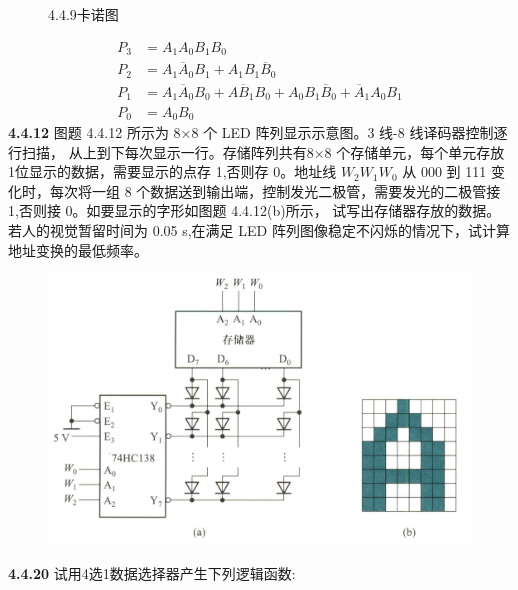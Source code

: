 \documentclass[a4paper,11pt,UTF8]{article}
\begin{document}
\begin{figure}[H]
	\centering
	\setcounter{subfigure}{0}
	\caption{4.4.9卡诺图}
\end{figure}
$$\begin{aligned}
	P_3&=A_1A_0B_1B_0\\
	P_2&=A_1\overline{A}_0B_1+A_1B_1\overline{B}_0\\
	P_1&=A_1\overline{A}_0B_0+A\overline{B}_1B_0+A_0B_1\overline{B}_0+\overline{A}_1A_0B_1\\
	P_0&=A_0B_0
\end{aligned}
$$
\textbf{4.4.12} 图题 4.4.12 所示为 8×8 个 LED 阵列显示示意图。3 线-8 线译码器控制逐行扫描， 从上到下每次显示一行。存储阵列共有8×8 个存储单元，每个单元存放 1位显示的数据，需要显示的点存 1,否则存 0。地址线 $W_2W_1W_0$ 从 000 到 111 变化时，每次将一组 8 个数据送到输出端，控制发光二极管，需要发光的二极管接 1,否则接 0。如要显示的字形如图题 4.4.12(b)所示， 试写出存储器存放的数据。若人的视觉暂留时间为 0.05 s,在满足 LED 阵列图像稳定不闪烁的情况下，试计算地址变换的最低频率。
\begin{figure}[H]
	\centering
	\includegraphics[width=1\textwidth]{4.4.12}
\end{figure}
\textbf{4.4.20} 试用4选1数据选择器产生下列逻辑函数:
\end{document}
